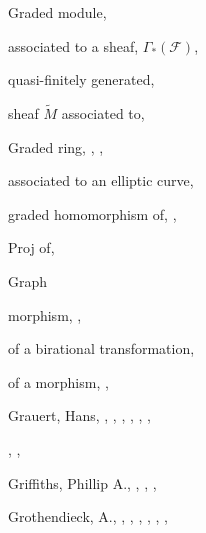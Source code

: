 {{\noindent\hspace*{0.0bp}Graded module, \par
\noindent\hspace*{7.5bp}associated to a sheaf, $\Gamma_*(\mathcal F)$, \par
\noindent\hspace*{7.5bp}quasi-finitely generated, \par
\noindent\hspace*{7.5bp}sheaf $\widetilde M$ associated to, \par
\noindent\hspace*{0.0bp}Graded ring, , , \par
\noindent\hspace*{7.5bp}associated to an elliptic curve, \par
\noindent\hspace*{7.5bp}graded homomorphism of, , \par
\noindent\hspace*{7.5bp}Proj of, \par
\noindent\hspace*{0.0bp}Graph\par
\noindent\hspace*{7.5bp}morphism, , \par
\noindent\hspace*{7.5bp}of a birational transformation, \par
}\hfill%
\parbox[t]{162.5bp}{\fontsize{8.05}{8.49}\selectfont%
\raggedright\setlength{\parskip}{0pt}%
\noindent\hspace*{7.5bp}of a morphism, , \par
\noindent\hspace*{0.0bp}Grauert, Hans, , , , , , ,\par
\noindent\hspace*{15.0bp}, , \par
\noindent\hspace*{0.0bp}Griffiths, Phillip A., , , , \par
\noindent\hspace*{0.0bp}Grothendieck, A., , , , , , ,\par
}}
